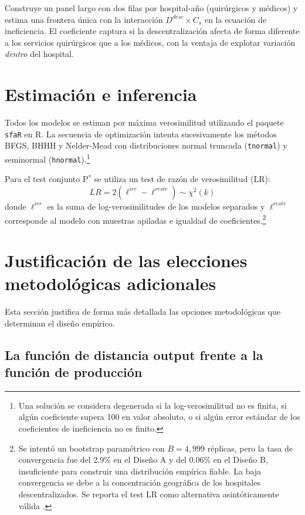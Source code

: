\documentclass[12pt, a4paper, twoside, openright]{book}
\theoremstyle{plain}
\theoremstyle{definition}
\theoremstyle{remark}
\begin{document}
Construye un panel largo con dos filas por hospital-año (quirúrgicos y médicos) y estima una frontera única con la interacción $D^{desc}\times C_s$ en la ecuación de ineficiencia. El coeficiente captura si la descentralización afecta de forma diferente a los servicios quirúrgicos que a los médicos, con la ventaja de explotar variación \textit{dentro} del hospital.

\section{Estimación e inferencia}

Todos los modelos se estiman por máxima verosimilitud utilizando el paquete \texttt{sfaR} \citep{dakpo2024} en R. La secuencia de optimización intenta sucesivamente los métodos BFGS, BHHH y Nelder-Mead con distribuciones normal truncada (\texttt{tnormal}) y seminormal (\texttt{hnormal}).\footnote{Una solución se considera degenerada si la log-verosimilitud no es finita, si algún coeficiente supera 100 en valor absoluto, o si algún error estándar de los coeficientes de ineficiencia no es finito.}

Para el test conjunto P$^*$ se utiliza un test de razón de verosimilitud (LR):
\begin{equation}
  LR = 2\left(\ell^{irr} - \ell^{restr}\right) \sim \chi^2(k)
  \label{eq:lr_test}
\end{equation}
donde $\ell^{irr}$ es la suma de log-verosimilitudes de los modelos separados y $\ell^{restr}$ corresponde al modelo con muestras apiladas e igualdad de coeficientes.\footnote{Se intentó un bootstrap paramétrico con $B=4{,}999$ réplicas, pero la tasa de convergencia fue del 2.9\% en el Diseño A y del 0.06\% en el Diseño B, insuficiente para construir una distribución empírica fiable. La baja convergencia se debe a la concentración geográfica de los hospitales descentralizados. Se reporta el test LR como alternativa asintóticamente válida \citep{simar2007}.}

\section{Justificación de las elecciones metodológicas adicionales}
\label{sec:justificacion_adicional}

Esta sección justifica de forma más detallada las opciones metodológicas que determinan el diseño empírico.

\subsection{La función de distancia output frente a la función de producción}
\end{document}
